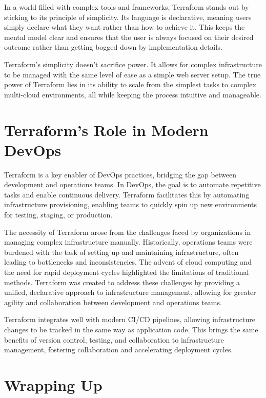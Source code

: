 In a world filled with complex tools and frameworks, Terraform stands out by sticking to its principle of simplicity. Its language is declarative, meaning users simply declare what they want rather than how to achieve it. This keeps the mental model clear and ensures that the user is always focused on their desired outcome rather than getting bogged down by implementation details.

Terraform's simplicity doesn't sacrifice power. It allows for complex infrastructure to be managed with the same level of ease as a simple web server setup. The true power of Terraform lies in its ability to scale from the simplest tasks to complex multi-cloud environments, all while keeping the process intuitive and manageable.

\section{Terraform's Role in Modern DevOps}

Terraform is a key enabler of DevOps practices, bridging the gap between development and operations teams. In DevOps, the goal is to automate repetitive tasks and enable continuous delivery. Terraform facilitates this by automating infrastructure provisioning, enabling teams to quickly spin up new environments for testing, staging, or production.

The necessity of Terraform arose from the challenges faced by organizations in managing complex infrastructure manually. Historically, operations teams were burdened with the task of setting up and maintaining infrastructure, often leading to bottlenecks and inconsistencies. The advent of cloud computing and the need for rapid deployment cycles highlighted the limitations of traditional methods. Terraform was created to address these challenges by providing a unified, declarative approach to infrastructure management, allowing for greater agility and collaboration between development and operations teams.

Terraform integrates well with modern CI/CD pipelines, allowing infrastructure changes to be tracked in the same way as application code. This brings the same benefits of version control, testing, and collaboration to infrastructure management, fostering collaboration and accelerating deployment cycles.

\section{Wrapping Up}

